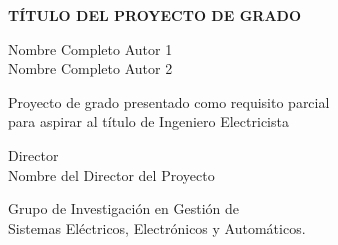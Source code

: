 \documentclass[12pt,twoside]{article}
\date{}
\begin{document}
\noindent \begin{center}
{\footnotesize{}\vspace{1cm}
}\textbf{TÍTULO DEL PROYECTO DE GRADO}
\par\end{center}

\noindent \begin{center}
\vspace{0.7cm}

\par\end{center}

\begin{center}
Nombre Completo Autor 1 \\ Nombre Completo Autor 2
\par\end{center}

\noindent \begin{center}
\vspace{0.7cm}

\par\end{center}

\noindent \begin{center}
Proyecto de grado presentado como requisito parcial\\para aspirar
al título de Ingeniero Electricista
\par\end{center}

\noindent \begin{center}
\vspace{0.7cm}

\par\end{center}

\noindent \begin{center}
Director\\
Nombre del Director del Proyecto\\
\par\end{center}

\noindent \begin{center}
Grupo de Investigación en Gestión de \\
Sistemas Eléctricos, Electrónicos y Automáticos.
\par\end{center}

\noindent \begin{center}
\vspace{0.7cm}

\par\end{center}
\end{document}
